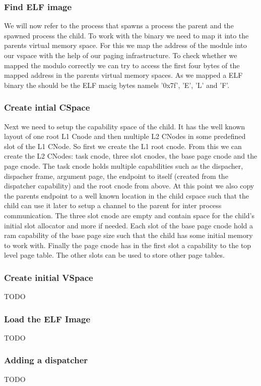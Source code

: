 \subsubsection{Find ELF image}
We will now refer to the process that spawns a process the parent and the spawned process the child.
To work with the binary we need to map it into the parents virtual memory space. For this we map the address of the module into our vspace with the help of our paging infrastructure.
To check whether we mapped the modulo correctly we can try to access the first four bytes of the mapped address in the parents virtual memory spaces. As we mapped a ELF binary the should be the ELF macig bytes namels '0x7f', 'E', 'L' and 'F'.

\subsubsection{Create intial CSpace}
Next we need to setup the capability space of the child. It has the well known layout of one root L1 Cnode and then multiple L2 CNodes in some predefined slot of the L1 CNode.
So first we create the L1 root cnode. From this we can create the L2 CNodes: task cnode, three slot cnodes, the base page cnode and the page cnode.
The task cnode holds multiple capabilities such as the dispacher, dispacher frame, argument page, the endpoint to itself (created from the dispatcher capability) and the root cnode from above.
At this point we also copy the parents endpoint to a well known location in the child cspace such that the child can use it later to setup a channel to the parent for inter process communication.
The three slot cnode are empty and contain space for the child's initial slot allocator and more if needed.
Each slot of the base page cnode hold a ram capability of the base page size such that the child has some initial memory to work with.
Finally the page cnode has in the first slot a capability to the top level page table. The other slots can be used to store other page tables.

\subsubsection{Create initial VSpace}
TODO

\subsubsection{Load the ELF Image}
TODO

\subsubsection{Adding a dispatcher}
TODO

